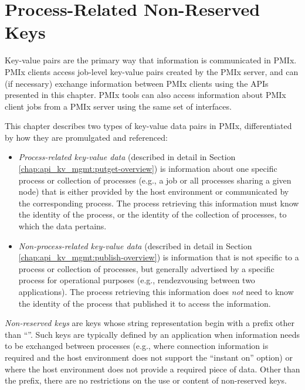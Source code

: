 \chapter{Process-Related Non-Reserved Keys}
\label{chap:nrkeys}


Key-value pairs are the primary way that information is communicated in \ac{PMIx}. \ac{PMIx} clients access job-level key-value pairs created by the \ac{PMIx} server, and can (if necessary) exchange information between \ac{PMIx} clients using the \acp{API} presented in this chapter.
\ac{PMIx} tools can also access information about \ac{PMIx} client jobs from a \ac{PMIx} server using the
same set of interfaces.

This chapter describes two types of key-value data pairs in \ac{PMIx}, differentiated by how they are promulgated and referenced:

\begin{itemize}
    \item \emph{Process-related key-value data} (described in detail in Section \ref{chap:api_kv_mgmt:putget-overview}) is information about one specific process or collection of processes (e.g., a job or all processes sharing a given node) that is either provided by the host environment or communicated by the corresponding process. The process retrieving this information must know the identity of the process, or the identity of the collection of processes, to which the data pertains.

    \item \emph{Non-process-related key-value data} (described in detail in Section \ref{chap:api_kv_mgmt:publish-overview}) is information that is not specific to a process or collection of processes, but generally advertised by a specific process for operational purposes (e.g., rendezvousing between two applications). The process retrieving this information does \emph{not} need to know the identity of the process that published it to access the information.
\end{itemize}

\emph{Non-reserved keys} are keys whose string representation begin with a
prefix other than ``''. Such keys are typically defined by an
application when information needs to be exchanged between processes (e.g.,
where connection information is required and the host environment does not
support the ``instant on'' option) or where the host environment does not
provide a required piece of data. Other than the prefix, there are no
restrictions on the use or content of non-reserved keys.


